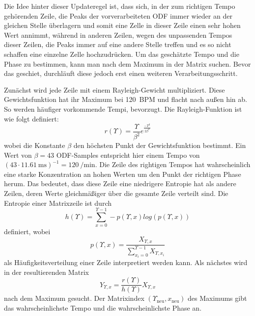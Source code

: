 {{{			%
			Die Idee hinter dieser Updateregel ist,
				dass sich,
				in der zum richtigen Tempo gehörenden Zeile,
				die Peaks der vorverarbeiteten ODF immer wieder an der gleichen Stelle überlagern
				und somit eine Zelle in dieser Zeile einen sehr hohen Wert annimmt,
				während in anderen Zeilen,
				wegen des unpassenden Tempos dieser Zeilen,
				die Peaks immer auf eine andere Stelle treffen
				und es so nicht schaffen eine einzelne Zelle hochzudrücken.
			Um das geschätzte Tempo und die Phase zu bestimmen,
				kann man nach dem Maximum in der Matrix suchen.
			Bevor das geschiet,
				durchläuft diese jedoch erst einen weiteren Verarbeitungsschritt.

			Zunächst wird jede Zeile mit einem Rayleigh-Gewicht multipliziert.
			Diese Gewichtsfunktion hat ihr Maximum bei \SI{120}{BPM} und flacht nach au{\ss}en hin ab.
			So werden häufiger vorkommende Tempi, bevorzugt.
			Die Rayleigh-Funktion ist wie folgt definiert:
			\begin{equation}
				r(\Upsilon) = \frac{\Upsilon}{\beta^2}e^{\frac{-\Upsilon^2}{2\beta^2}}
			\end{equation}
			wobei die Konstante $\beta$ den höchsten Punkt der Gewichtsfunktion bestimmt.
			Ein Wert von $\beta = 43$ ODF-Samples entspricht hier einem Tempo von
				$(43 \cdot \SI{11.61}{\milli\second})^{-1} = \SI{120}{\per\minute}$.
			Die Zeile des rightigen Tempos hat wahrscheinlich eine starke Konzentration an hohen Werten um den Punkt der richtigen Phase herum.
			Das bedeutet,
				dass diese Zeile eine niedrigere Entropie hat als andere Zeilen,
				deren Werte gleichmä{\ss}iger über die gesamte Zeile verteilt sind.
			Die Entropie einer Matrixzeile ist durch
				\begin{equation}
					h(\Upsilon) = \sum_{x = 0}^{\Upsilon - 1} -p(\Upsilon, x) log(p(\Upsilon, x))
				\end{equation}
				definiert, wobei
				\begin{equation}
					p(\Upsilon, x) = \frac{X_{\Upsilon, x}}{\sum_{x_i = 0}^{\Upsilon - 1}X_{\Upsilon, x_i}}
				\end{equation}
				als Häufigkeitsverteilung einer Zeile interpretiert werden kann.
			Als nächstes wird in der resultierenden Matrix
				\begin{equation}
					Y_{\Upsilon, x} = \frac{r(\Upsilon)}{h(\Upsilon)}X_{\Upsilon, x}
				\end{equation}
				nach dem Maximum gesucht.
			Der Matrixindex $(\Upsilon_{\text{neu}}, x_{\text{neu}})$ des Maximums gibt das wahrscheinlichste Tempo und die wahrscheinlichste Phase an.

}}}
